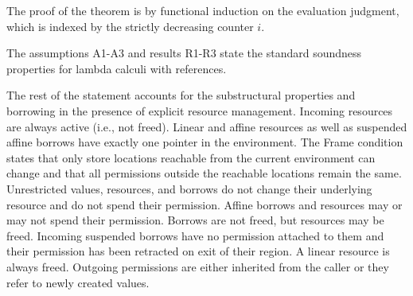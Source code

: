 The proof of the
theorem is by functional induction on the evaluation judgment, which
is indexed by the strictly decreasing counter $i$.

The assumptions A1-A3 and results R1-R3 state the standard soundness properties
for lambda calculi with references.

The rest of the statement accounts for the substructural properties and
borrowing in the presence of explicit resource management.
%
%
%
Incoming resources are always active (i.e., not freed).
Linear and affine resources as well as suspended affine borrows have
exactly one pointer in the environment.
%
The Frame condition states that only store locations reachable from
the current environment can change and that all permissions outside
the reachable locations remain the same.
%
Unrestricted values, resources, and borrows do not change their
underlying resource and do not spend their permission.
%
Affine borrows and resources may or may not spend their
permission. Borrows are not freed, but resources may be freed.
%
Incoming suspended borrows have no permission attached to them and
their permission has been retracted on exit of their region.
%
A linear resource is always freed.
%
Outgoing permissions are either inherited from the caller or they
refer to newly created values.

\lstDeleteShortInline@


